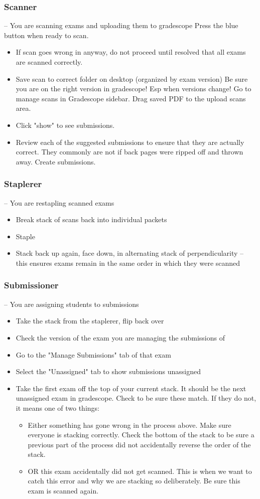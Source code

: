 \documentclass[a4paper]{article}
\begin{document}
\subsubsection{Scanner} – You are scanning exams and uploading them to gradescope
Press the blue button when ready to scan.
\begin{itemize}
\item If scan goes wrong in anyway, do not proceed until resolved that all exams are scanned correctly.
\item Save scan to correct folder on desktop (organized by exam version)
Be sure you are on the right version in gradescope! Esp when versions change!
Go to manage scans in Gradescope sidebar. Drag saved PDF to the upload scans area.
\item Click "show" to see submissions.
\item Review each of the suggested submissions to ensure that they are actually correct. They commonly are not if back pages were ripped off and thrown away.
Create submissions.
\end{itemize}
\subsubsection{Staplerer} – You are restapling scanned exams

\begin{itemize}
\item Break stack of scans back into individual packets 
\item Staple
\item Stack back up again, face down, in alternating stack of perpendicularity – this ensures exams remain in the same order in which they were scanned
\end{itemize}
\subsubsection{Submissioner} – You are assigning students to submissions
\begin{itemize}
\item Take the stack from the staplerer, flip back over
\item Check the version of the exam you are managing the submissions of
\item Go to the "Manage Submissions" tab of that exam
\item Select the "Unassigned" tab to show submissions unassigned
\item Take the first exam off the top of your current stack. It should be the next unassigned exam in gradescope. Check to be sure these match. If they do not, it means one of two things:
\begin{itemize}
\item Either something has gone wrong in the process above. Make sure everyone is stacking correctly. Check the bottom of the stack to be sure a previous part of the process did not accidentally reverse the order of the stack.
\item OR this exam accidentally did not get scanned. This is when we want to catch this error and why we are stacking so deliberately. Be sure this exam is scanned again.
\end{itemize}
\end{itemize}
\end{document}
